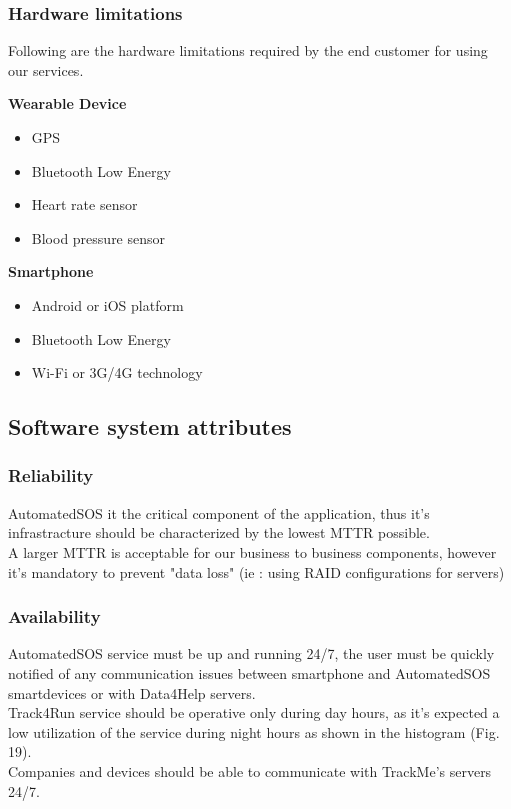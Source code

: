 \documentclass[../main.tex]{subfiles}
\begin{document}
\subsubsection{Hardware limitations}

Following are the hardware limitations required by the end customer for using our services.

\vspace*{8mm}
\begin{minipage}{\textwidth}
{\bf Wearable Device}
\begin{itemize}
	\item GPS
	\item Bluetooth Low Energy
	\item Heart rate sensor
	\item Blood pressure sensor
\end{itemize}
\end{minipage}

\vspace*{8mm}
\begin{minipage}{\textwidth}
{\bf Smartphone}
\begin{itemize}
	\item Android or iOS platform
	\item Bluetooth Low Energy
	\item Wi-Fi or 3G/4G technology
\end{itemize}
\end{minipage}

\subsection{Software system attributes}

\subsubsection{Reliability}
   AutomatedSOS it the critical component of the application, thus it's infrastracture should be characterized by the lowest MTTR possible.\\
   A larger MTTR is acceptable for our business to business components, however it's mandatory to prevent "data loss" (ie : using RAID configurations for servers)


\subsubsection{Availability}


	AutomatedSOS service must be up and running 24/7, the user must be quickly notified of
	any communication issues between smartphone and AutomatedSOS smartdevices or with Data4Help servers.\\
	Track4Run service should be operative only during day hours, as it's expected a low utilization of the service during night hours as shown
	in the histogram (Fig. 19).\\
	Companies and devices should be able to communicate with TrackMe's servers 24/7.
\end{document}
